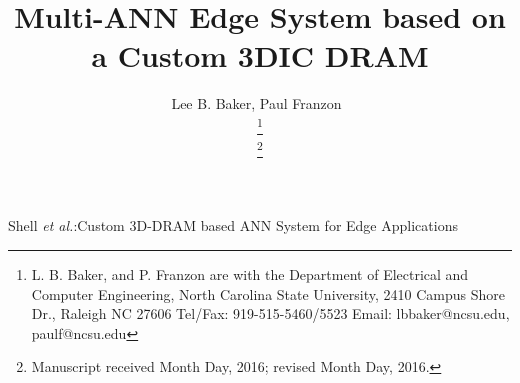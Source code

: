 \documentclass[journal]{IEEEtran}
\begin{document}
%
\title{Multi-ANN Edge System based on a Custom 3DIC DRAM}
%
%
%
\author{{Lee B. Baker, Paul Franzon~}%

\thanks{L. B. Baker, and P. Franzon are with the Department of Electrical and Computer Engineering,
North Carolina State University,
2410 Campus Shore Dr., Raleigh NC 27606 
Tel/Fax:
919-515-5460/5523
Email: 
lbbaker@ncsu.edu,
paulf@ncsu.edu}

\thanks{Manuscript received Month Day, 2016; revised Month Day, 2016.}}

% 
%



%
{Shell \MakeLowercase{\textit{et al.}}:Custom 3D-DRAM based ANN System for Edge Applications}
% 
\end{document}
